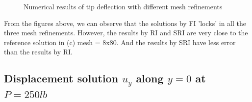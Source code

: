 \documentclass{article}
\begin{document}
\begin{figure}[H]
    \centering
    \qquad
    \qquad
    \caption{Numerical results of tip deflection with different mesh refinements}
\end{figure}

From the figures above, we can observe that the solutions by FI 'locks' in all the three mesh refinements. However, the results by RI and SRI are very close to the reference solution in (c) mesh = 8x80. And the results by SRI have less error than the results by RI.

\vspace*{0.5em}
\subsection{Displacement solution $u_y$ along $y = 0$ at $P = 250 lb$}
\vspace*{0.5em}
\end{document}
